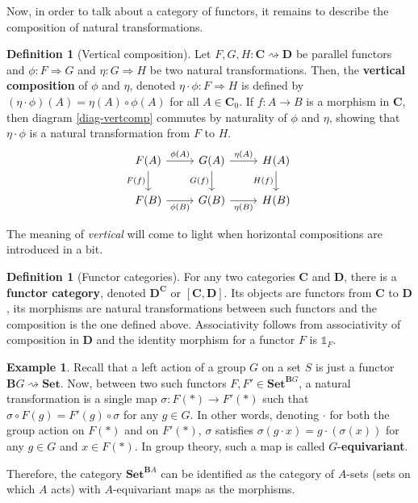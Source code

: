\documentclass{article}
\theoremstyle{definition}
\newtheorem{defn}[thm]{Definition}
\newtheorem{exmp}[thm]{Example}
\theoremstyle{remark}
\newcommand{\one}{\mathbb{1}}
\begin{document}
Now, in order to talk about a category of functors, it remains to describe the composition of natural transformations.
\begin{defn}[Vertical composition]
	Let $F,G,H: \mathbf{C}\rightsquigarrow \mathbf{D}$ be parallel functors and $\phi:F\Rightarrow G$ and $\eta:G\Rightarrow H$ be two natural transformations. Then, the \textbf{vertical composition} of $\phi$ and $\eta$, denoted $\eta\cdot \phi:F\Rightarrow H$ is defined by $(\eta \cdot \phi)(A) = \eta(A) \circ \phi(A)$ for all $A \in \mathbf{C}_0$. If $f: A\rightarrow B$ is a morphism in $\mathbf{C}$, then diagram \eqref{diag-vertcomp} commutes by naturality of $\phi$ and $\eta$, showing that $\eta \cdot \phi$ is a natural transformation from $F$ to $H$.
	\begin{equation}\label{diag-vertcomp}
	\begin{tikzcd}
	F(A) \arrow[r, "\phi(A)"] \arrow[d, "F(f)"'] & G(A) \arrow[r, "\eta(A)"] \arrow[d, "G(f)"'] & H(A) \arrow[d, "H(f)"'] \\
	F(B) \arrow[r, "\phi(B)"'] & G(B) \arrow[r, "\eta(B)"'] & H(B)
	\end{tikzcd}
	\end{equation}
	
	 The meaning of \textit{vertical} will come to light when horizontal compositions are introduced in a bit.
\end{defn}
\begin{defn}[Functor categories]
	For any two categories $\mathbf{C}$ and $\mathbf{D}$, there is a \textbf{functor category}, denoted $\mathbf{D}^{\mathbf{C}}$ or $[\mathbf{C}, \mathbf{D}]$. Its objects are functors from $\mathbf{C}$ to $\mathbf{D}$, its morphisms are natural transformations between such functors and the composition is the one defined above. Associativity follows from associativity of composition in $\mathbf{D}$ and the identity morphism for a functor $F$ is $\one_F$.
\end{defn}
\begin{exmp}
	Recall that a left action of a group $G$ on a set $S$ is just a functor $\mathbf{B}G \rightsquigarrow \textbf{Set}$. Now, between two such functors $F,F' \in \textbf{Set}^{\mathbf{B}G}$, a natural transformation is a single map $\sigma: F(\ast) \rightarrow F'(\ast)$ such that $\sigma \circ F(g) = F'(g) \circ \sigma$ for any $g \in G$. In other words, denoting $\cdot$ for both the group action on $F(\ast)$ and on $F'(\ast)$, $\sigma$ satisfies $\sigma(g\cdot x) = g\cdot(\sigma(x))$ for any $g \in G$ and $x \in F(\ast)$. In group theory, such a map is called $G$-\textbf{equivariant}.
	
	Therefore, the category $\textbf{Set}^{\mathbf{B}A}$ can be identified as the category of $A$-sets (sets on which $A$ acts) with $A$-equivariant maps as the morphisms.
\end{exmp}
\end{document}
